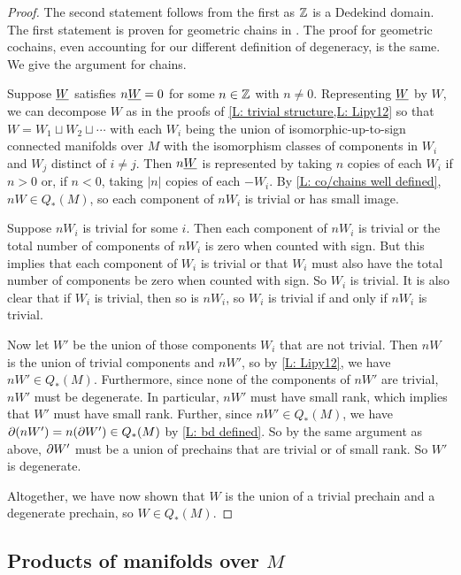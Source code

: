 \begin{proof}
	The second statement follows from the first as $\mathbb{Z}$ is a Dedekind domain.
	The first statement is proven for geometric chains in \cite[Lemma 34]{Lipy14}.
	The proof for geometric cochains, even accounting for our different definition of degeneracy, is the same.
	We give the argument for chains.

	Suppose $\underline{W}$ satisfies $n \underline{W} = 0$ for some $n \in \mathbb{Z}$ with $n \neq 0$.
	Representing $\underline{W}$ by $W$, we can decompose $W$ as in the proofs of \cref{L: trivial structure,L: Lipy12} so that $W = W_1 \sqcup W_2 \sqcup \cdots$ with each $W_i$ being the union of isomorphic-up-to-sign connected manifolds over $M$ with the isomorphism classes of components in $W_i$ and $W_j$ distinct of $i\neq j$.
	Then $n \underline{W}$ is represented by taking $n$ copies of each $W_i$ if $n > 0$ or, if $n < 0$, taking $|n|$ copies of each $-W_i$.
	By \cref{L: co/chains well defined}, $n W \in Q_*(M)$, so each component of $n W_i$ is trivial or has small image.

	Suppose $n W_i$ is trivial for some $i$.
	Then each component of $n W_i$ is trivial or the total number of components of $n W_i$ is zero when counted with sign.
	But this implies that each component of $W_i$ is trivial or that $W_i$ must also have the total number of components be zero when counted with sign.
	So $W_i$ is trivial.
	It is also clear that if $W_i$ is trivial, then so is $n W_i$, so $W_i$ is trivial if and only if $n W_i$ is trivial.

	Now let $W'$ be the union of those components $W_i$ that are not trivial.
	Then $nW$ is the union of trivial components and $n W'$, so by \cref{L: Lipy12}, we have $n W' \in Q_*(M)$.
	Furthermore, since none of the components of $n W'$ are trivial, $n W'$ must be degenerate.
	In particular, $n W'$ must have small rank, which implies that $W'$ must have small rank.
	Further, since $n W' \in Q_*(M)$, we have $\partial (n W') = n (\partial W') \in Q_*(M)$ by \cref{L: bd defined}.
	So by the same argument as above, $\partial W'$ must be a union of prechains that are trivial or of small rank.
	So $W'$ is degenerate.

	Altogether, we have now shown that $W$ is the union of a trivial prechain and a degenerate prechain, so $W \in Q_*(M)$.
\end{proof}

\subsection{Products of manifolds over \texorpdfstring{$M$}{M}}

